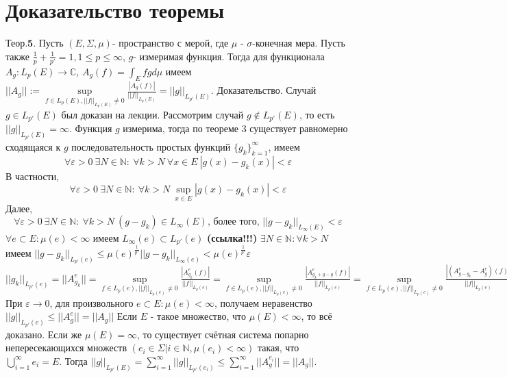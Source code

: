 \documentclass[a4paper,14pt]{article}
\begin{document}
\section{Доказательство теоремы}
$\textbf{Теор.5.}$ Пусть $(E,\Sigma,\mu)$- пространство с мерой, где $\mu$ - $\sigma$-конечная мера. Пусть также $\frac{1}{p}+\frac{1}{p'}=1,1\leq p\leq\infty$, $g$- измеримая функция. Тогда для функционала $A_g:L_p(E)\rightarrow\mathbb{C}$, $A_g(f)=\int_E fgd\mu$ имеем $||A_g||:=\sup\limits_{f\in L_p(E), ||f||_{L_p(E)}\neq 0}\frac{|A_g(f)|}{||f||_{L_p(E)}} =||g||_{L_{p'}(E)}$.\newline
$\textbf{Доказательство.}$ Случай $g\in L_{p'}(E)$ был доказан на лекции. Рассмотрим случай $g\not\in L_{p'}(E)$, то есть $||g||_{L_{p'}(E)}=\infty$. Функция $g$ измерима, тогда по теореме 3 существует равномерно сходящаяся к $g$ последовательность простых функций $\{g_k\}_{k=1}^{\infty}$, имеем $$\forall\varepsilon>0\ \exists N\in\mathbb{N}:\ \forall k>N\ \forall x\in E\ |g(x)-g_k(x)|<\varepsilon$$
В частности, $$\forall\varepsilon>0\ \exists N\in\mathbb{N}:\ \forall k>N\ \sup\limits_{x\in E}|g(x)-g_k(x)|<\varepsilon$$
Далее, $$\forall\varepsilon>0\ \exists N\in\mathbb{N}:\ \forall k>N\ (g-g_k)\in L_{\infty}(E)\text{, более того, } ||g-g_k||_{L_{\infty}(E)}<\varepsilon$$
$\forall e\subset E:\mu(e)<\infty$ имеем $L_{\infty}(e)\subset L_{p'}(e)$ \textbf{(ссылка!!!)}\newline
$\exists N\in\mathbb{N}:\forall k>N$ имеем $||g-g_k||_{L_{p'}(e)}\leq \mu(e)^{\frac{1}{p'}}||g-g_k||_{L_{\infty}(e)}<\mu(e)^{\frac{1}{p'}}\varepsilon$\newline
$||g_k||_{L_{p'}(e)}=||A_{g_k}^e||=\sup\limits_{f\in L_p(e), ||f||_{L_p(e)}\neq 0} \frac{|A_{g_k}^e(f)|}{||f||_{L_p(e)}}=\sup\limits_{f\in L_p(e), ||f||_{L_p(e)}\neq 0} \frac{|A_{g_k+g-g}^e(f)|}{||f||_{L_p(e)}}=\sup\limits_{f\in L_p(e), ||f||_{L_p(e)}\neq 0} \frac{|(A_{g-g_k}^e-A_{g}^e)(f)|}{||f||_{L_p(e)}}\leq ||A_{g-g_k}^e||+||A_g^e||\leq \mu(e)^{\frac{1}{p'}}\varepsilon +||A_g^e||$\newline
При $\varepsilon\rightarrow 0$, для произвольного $e\subset E:\mu(e)<\infty$,  получаем неравенство $||g||_{L_{p'}(e)}\leq ||A_g^e|| = ||A_g||$\newline
Если $E$ - такое множество, что $\mu(E)<\infty$, то всё доказано. Если же $\mu(E)=\infty$, то существует счётная система попарно непересекающихся множеств $(e_i\in\Sigma|i\in\mathbb{N},\mu(e_i)<\infty)$ такая, что $\bigcup\limits_{i=1}^{\infty}e_i=E$.\newline
Тогда $||g||_{L_{p'}(E)}=\sum\limits_{i=1}^{\infty}||g||_{L_{p'}(e_i)}\leq \sum\limits_{i=1}^{\infty}||A_g^{e_i}|| = ||A_g||$.\newline
\end{document}
